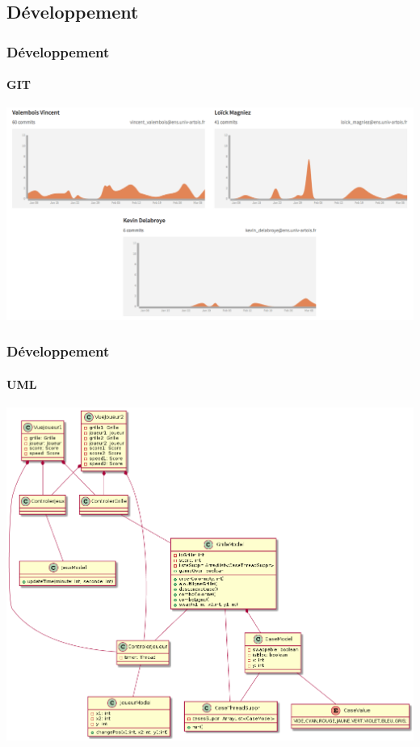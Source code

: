 \documentclass{beamer}
\begin{document}
\begin{darkframes}
 \section{Développement}
 \begin{frame}
 	 \frametitle{Développement}
 	 \begin{center}
 	 \framesubtitle{GIT}
		\includegraphics[scale=0.40]{./Image/git.png}
		\end{center}
    \end{frame}
    
     \begin{frame}
 	 \frametitle{Développement}
 	 \begin{center}
 	 \framesubtitle{UML}
 	 \includegraphics[scale=0.25]{./Image/diagramFinal.png}
		
		\end{center}
    \end{frame}
  

\end{darkframes}
\end{document}
